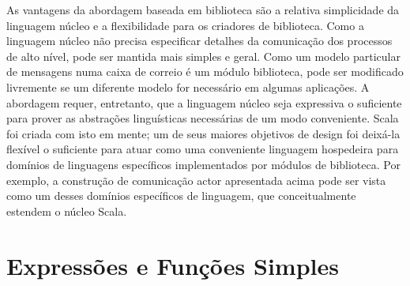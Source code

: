 As vantagens da abordagem baseada em biblioteca s\~{a}o a relativa simplicidade
da linguagem n\'{u}cleo e a flexibilidade para os criadores de biblioteca. Como 
a linguagem n\'{u}cleo n\~{a}o precisa especificar detalhes da comunica\c{c}\~{a}o dos 
processos de alto n\'{i}vel, pode ser mantida mais simples e geral. Como
um modelo particular de mensagens numa caixa de correio \'{e} um m\'{o}dulo biblioteca, 
pode ser modificado livremente se um diferente modelo for necess\'{a}rio em algumas 
aplica\c{c}\~{o}es. A abordagem requer, entretanto, que a linguagem n\'{u}cleo seja expressiva
o suficiente para prover as abstra\c{c}\~{o}es lingu\'{i}sticas necess\'{a}rias de um modo 
conveniente. Scala foi criada com isto em mente; um de seus maiores objetivos de 
design foi deix\'{a}-la flex\'{i}vel o suficiente para atuar como uma conveniente linguagem
hospedeira para dom\'{i}nios de linguagens espec\'{i}ficos implementados por m\'{o}dulos de 
biblioteca. Por exemplo, a constru\c{c}\~{a}o de comunica\c{c}\~{a}o actor apresentada acima
pode ser vista como um desses dom\'{i}nios espec\'{i}ficos de linguagem, que conceitualmente
estendem o n\'{u}cleo Scala.  

\chapter{\label{chap:simple-funs}Express\~{o}es e Fun\c{c}\~{o}es Simples}

